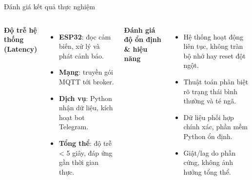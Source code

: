 \begin{frame}{Đánh giá kết quả thực nghiệm}
\begin{columns}[T]
    \textbf{Độ trễ hệ thống (Latency)}
    \begin{itemize}
        \item \textbf{ESP32}: đọc cảm biến, xử lý và phát cảnh báo.
        \item \textbf{Mạng}: truyền gói MQTT tới broker.
        \item \textbf{Dịch vụ}: Python nhận dữ liệu, kích hoạt bot Telegram.
        \item \textbf{Tổng thể}: độ trễ < 5 giây, đáp ứng gần thời gian thực.
    \end{itemize}

    \textbf{Đánh giá độ ổn định \& hiệu năng}
    \begin{itemize}
        \item Hệ thống hoạt động liên tục, không tràn bộ nhớ hay reset đột ngột.
        \item Thuật toán phân biệt rõ trạng thái bình thường và té ngã.
        \item Dữ liệu phối hợp chính xác, phần mềm Python ổn định.
        \item Giật/lag do phần cứng, không ảnh hưởng tổng thể.
    \end{itemize}
\end{columns}
\end{frame}

